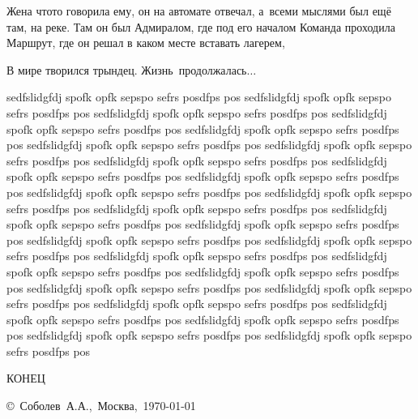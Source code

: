 {Жена что\sdash то говорила ему, он на автомате отвечал, а~всеми мыслями был ещё там, на реке. Там он был Адмиралом, где под его началом Команда проходила Маршрут, где он решал в каком месте вставать лагерем, 

В мире творился трындец. Жизнь~продолжалась$\ldots$

sedfslidgfdj spofk opfk sepspo sefrs posdfps pos sedfslidgfdj spofk opfk sepspo sefrs posdfps pos sedfslidgfdj spofk opfk sepspo sefrs posdfps pos sedfslidgfdj spofk opfk sepspo sefrs posdfps pos sedfslidgfdj spofk opfk sepspo sefrs posdfps pos sedfslidgfdj spofk opfk sepspo sefrs posdfps pos sedfslidgfdj spofk opfk sepspo sefrs posdfps pos sedfslidgfdj spofk opfk sepspo sefrs posdfps pos sedfslidgfdj spofk opfk sepspo sefrs posdfps pos sedfslidgfdj spofk opfk sepspo sefrs posdfps pos sedfslidgfdj spofk opfk sepspo sefrs posdfps pos sedfslidgfdj spofk opfk sepspo sefrs posdfps pos sedfslidgfdj spofk opfk sepspo sefrs posdfps pos sedfslidgfdj spofk opfk sepspo sefrs posdfps pos sedfslidgfdj spofk opfk sepspo sefrs posdfps pos sedfslidgfdj spofk opfk sepspo sefrs posdfps pos sedfslidgfdj spofk opfk sepspo sefrs posdfps pos sedfslidgfdj spofk opfk sepspo sefrs posdfps pos sedfslidgfdj spofk opfk sepspo sefrs posdfps pos sedfslidgfdj spofk opfk sepspo sefrs posdfps pos sedfslidgfdj spofk opfk sepspo sefrs posdfps pos sedfslidgfdj spofk opfk sepspo sefrs posdfps pos sedfslidgfdj spofk opfk sepspo sefrs posdfps pos sedfslidgfdj spofk opfk sepspo sefrs posdfps pos sedfslidgfdj spofk opfk sepspo sefrs posdfps pos sedfslidgfdj spofk opfk sepspo sefrs posdfps pos sedfslidgfdj spofk opfk sepspo sefrs posdfps pos 


%


\begin{center}
\end{center}

\begin{center}
	\Large {КОНЕЦ}
\end{center}
}

\vspace{2cm}
\begin{flushright}
	\copyright~Соболев~А.А.,~Москва,~\today\\
\end{flushright}

